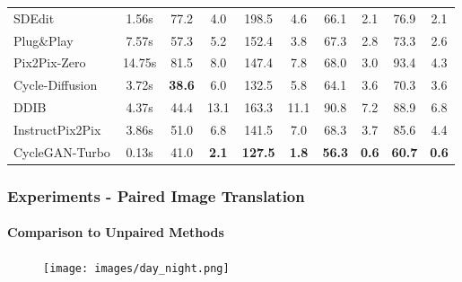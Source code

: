 \begin{frame}
\begin{table}
{\begin{tabular}{l c cc cc cc cc}
            \hdashline
    
            SDEdit \cite{meng2022sdedit} & 1.56s
            & 77.2 & 4.0
            & 198.5 & 4.6  
            & 66.1 & 2.1 
            & 76.9 & 2.1\\
            
            Plug\&Play \cite{tumanyan2022plugandplay} & 7.57s
            & 57.3 & 5.2  
            & 152.4 & 3.8 
            & 67.3 & 2.8 
            & 73.3 & 2.6\\
            
            Pix2Pix-Zero \cite{parmar2023zeroshot}  & 14.75s
            & 81.5 & 8.0
            & 147.4 & 7.8
            & 68.0 & 3.0
            & 93.4 & 4.3 \\
            
            Cycle-Diffusion \cite{cyclediffusion} & 3.72s
            & \textbf{38.6} & 6.0 
            & 132.5 & 5.8 
            & 64.1 & 3.6
            & 70.3 & 3.6 \\
    
            DDIB \cite{su2022dual} & 4.37s
            & 44.4 & 13.1  
            & 163.3 & 11.1 
            & 90.8 & 7.2
            & 88.9 & 6.8 \\
    
            InstructPix2Pix \cite{brooks2023instructpix2pix} & 3.86s
            & 51.0 & 6.8 
            & 141.5 & 7.0 
            & 68.3 & 3.7 
            & 85.6 & 4.4 \\
            \hdashline
    
            CycleGAN-Turbo & 0.13s
            & 41.0 & \textbf{2.1}
            & \textbf{127.5} & \textbf{1.8} 
            & \textbf{56.3} & \textbf{0.6} 
            & \textbf{60.7} & \textbf{0.6}\\
    
            \bottomrule 
        \end{tabular}
        }
        \vspace{-6pt}
    
        \label{tab:cmp_small_ds}
    \end{table}
\end{frame}

\begin{frame}
\frametitle{Experiments - Paired Image Translation}
\framesubtitle{Comparison to Unpaired Methods}
\begin{figure}
    \centering
    \texttt{[image: images/day\_night.png]}
    
\end{figure}
\end{frame}





